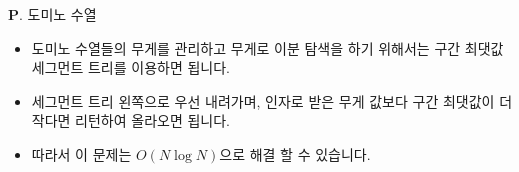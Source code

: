 \begin{frame}{\textbf{P}. 도미노 수열}
    \begin{itemize}
        \item 도미노 수열들의 무게를 관리하고 무게로 이분 탐색을 하기 위해서는 구간 최댓값 세그먼트 트리를 이용하면 됩니다.
        \item 세그먼트 트리 왼쪽으로 우선 내려가며, 인자로 받은 무게 값보다 구간 최댓값이 더 작다면 리턴하여 올라오면 됩니다.
        \item 따라서 이 문제는 $O(N\log N)$으로 해결 할 수 있습니다.
    \end{itemize}
\end{frame}